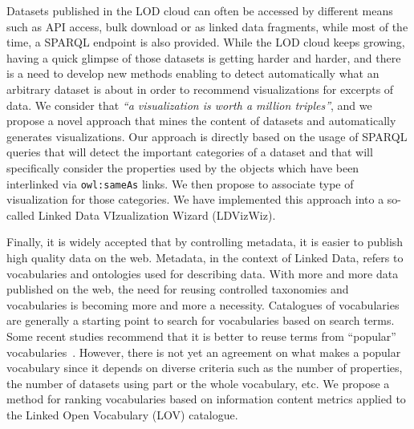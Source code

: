 Datasets published in the LOD cloud can often be accessed by different means such as API access, bulk download or as linked data fragments, while most of the time, a SPARQL endpoint is also provided. While the LOD cloud keeps growing, having a quick glimpse of those datasets is getting harder and harder, and there is a need to develop new methods enabling to detect automatically what an arbitrary dataset is about in order to recommend visualizations for excerpts of data. We consider that \textit{``a visualization is worth a million triples''}, and  we propose a novel approach that mines the content of datasets and automatically generates visualizations. Our approach is directly based on the usage of SPARQL queries that will detect the important categories of a dataset and that will specifically consider the properties used by the objects which have been interlinked via \texttt{owl:sameAs} links. We then propose to associate type of visualization for those categories. We have implemented this approach into a so-called Linked Data VIzualization Wizard (LDVizWiz).

Finally, it is widely accepted that by controlling metadata, it is easier to publish high quality data on the web. Metadata, in the context of Linked Data, refers to vocabularies and ontologies used for describing data. With more and more data published on the web, the need for reusing controlled taxonomies and vocabularies is becoming more and more a necessity. Catalogues of vocabularies are generally a starting point to search for vocabularies based on search terms. Some recent studies recommend that it is better to reuse terms from ``popular'' vocabularies~\cite{krzysztof14}. However, there is not yet an agreement on what makes a popular vocabulary since it depends on diverse criteria such as the number of properties, the number of datasets using part or the whole vocabulary, etc. We propose a method for ranking vocabularies based on information content metrics applied to the Linked Open Vocabulary (LOV) catalogue. 